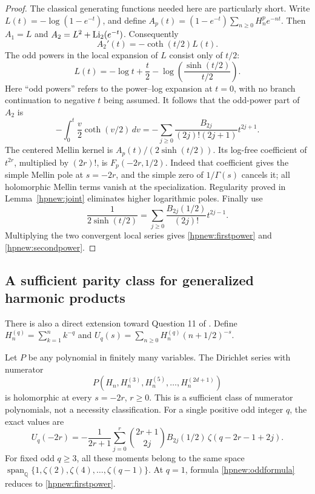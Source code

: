 \begin{proof}
The classical generating functions needed here are particularly short.
Write $L(t)=-\log(1-e^{-t})$, and define
$A_p(t)=(1-e^{-t})\sum_{n\ge0}H_n^pe^{-nt}$.
Then $A_1=L$ and $A_2=L^2+\operatorname{Li}_2(e^{-t})$.
Consequently
\[
                         A_2'(t)=-\coth(t/2)L(t).
\]
The odd powers in the local expansion of $L$ consist only of $t/2$:
\[
 L(t)=-\log t+\frac t2
                  -\log\left(\frac{\sinh(t/2)}{t/2}\right).
\]
Here ``odd powers'' refers to the power--log expansion at $t=0$,
with no branch continuation to negative $t$ being assumed.
It follows that the odd-power part of $A_2$ is
\[
 -\int_0^t\frac v2\coth(v/2)\,dv
       =-\sum_{j\ge0}\frac{B_{2j}}{(2j)!(2j+1)}t^{2j+1}.
\]
The centered Mellin kernel is $A_p(t)/(2\sinh(t/2))$.
Its log-free coefficient of $t^{2r}$, multiplied by $(2r)!$, is
$F_p(-2r,1/2)$. Indeed that coefficient gives the simple Mellin
pole at $s=-2r$, and the simple zero of $1/\Gamma(s)$ cancels
it; all holomorphic Mellin terms vanish at the specialization.
Regularity proved in Lemma~\ref{hpnew:joint} eliminates higher
logarithmic poles. Finally use
\[
 \frac1{2\sinh(t/2)}=
             \sum_{j\ge0}\frac{B_{2j}(1/2)}{(2j)!}t^{2j-1}.
\]
Multiplying the two convergent local series gives
\eqref{hpnew:firstpower} and \eqref{hpnew:secondpower}.
\end{proof}

\subsection{A sufficient parity class for generalized harmonic products}

There is also a direct extension toward Question 11 of
\cite{RepoExactResonant}. Define
$H_n^{(q)}=\sum_{k=1}^n k^{-q}$ and
$U_q(s)=\sum_{n\ge0}H_n^{(q)}(n+1/2)^{-s}$.

\begin{corollary}
\label{hpnew:oddorders}
Let $P$ be any polynomial in finitely many variables. The Dirichlet
series with numerator
\[
                 P(H_n,H_n^{(3)},H_n^{(5)},\ldots,H_n^{(2d+1)})
\]
is holomorphic at every $s=-2r$, $r\ge0$. This is a sufficient
class of numerator polynomials, not a necessity classification.
For a single positive odd integer $q$, the exact values are
\begin{equation}\label{hpnew:oddformula}
 \boxed{\displaystyle
 U_q(-2r)=-\frac1{2r+1}\sum_{j=0}^{r}\binom{2r+1}{2j}
          B_{2j}(1/2)\,
                         \zeta(q-2r-1+2j).}
\end{equation}
For fixed odd $q\ge3$, all these moments belong to the same space
$\operatorname{span}_{\mathbb Q}\{1,\zeta(2),\zeta(4),\ldots,
\zeta(q-1)\}$. At $q=1$, formula \eqref{hpnew:oddformula} reduces
to \eqref{hpnew:firstpower}.
\end{corollary}

